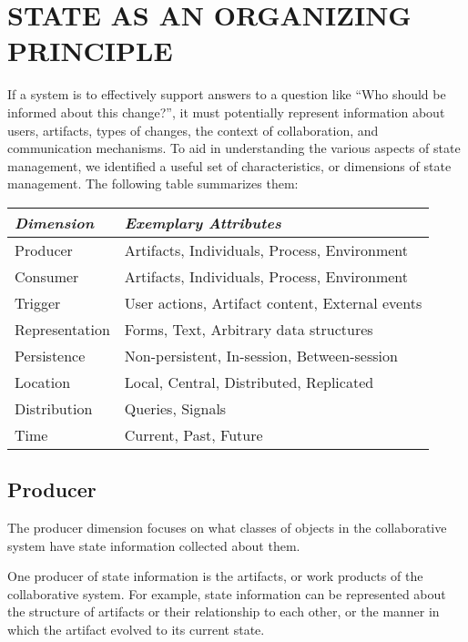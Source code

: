 \section{STATE AS AN ORGANIZING PRINCIPLE}

If a system is to effectively support answers to a question like ``Who
should be informed about this change?'', it must potentially represent
information about users, artifacts, types of changes, the context of
collaboration, and communication mechanisms.  To aid in understanding
the various aspects of state management, we identified a useful set 
of characteristics, or dimensions of state management.
The following table summarizes them:  


\begin{center}
\begin{tabular} {|p{1in}|p{2in}|} \hline   
{\em Dimension} & {\em Exemplary Attributes} \\ \hline
Producer & Artifacts,  Individuals,  Process, Environment     \\ \hline
Consumer & Artifacts,  Individuals,  Process, Environment     \\ \hline
Trigger & User actions, Artifact content, External events   \\ \hline
Representation & Forms, Text, Arbitrary data structures      \\ \hline
Persistence & Non-persistent, In-session, Between-session    \\ \hline
Location & Local, Central, Distributed, Replicated           \\ \hline
Distribution & Queries, Signals                              \\ \hline
Time         & Current, Past, Future                         \\ \hline
\end{tabular}
\end{center}

\subsection{Producer}

The producer dimension focuses on what classes of objects in the
collaborative system have state information collected about them.

One producer of state information is the artifacts, or work
products of the collaborative system. For example, state information can
be represented about the structure of artifacts or their relationship to
each other, or the manner in which the artifact evolved to its current
state.

